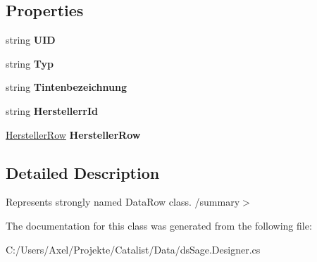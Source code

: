 \subsection*{Properties}
\begin{DoxyCompactItemize}
\item 
string {\bfseries U\+ID}\hypertarget{class_products_1_1_data_1_1ds_sage_1_1_tinte_row_a935601f7af8d05a25212af83d622baee}{}\label{class_products_1_1_data_1_1ds_sage_1_1_tinte_row_a935601f7af8d05a25212af83d622baee}

\item 
string {\bfseries Typ}\hypertarget{class_products_1_1_data_1_1ds_sage_1_1_tinte_row_a51e3b5c05f0c7ff0cdd9ec0b86e9361a}{}\label{class_products_1_1_data_1_1ds_sage_1_1_tinte_row_a51e3b5c05f0c7ff0cdd9ec0b86e9361a}

\item 
string {\bfseries Tintenbezeichnung}\hypertarget{class_products_1_1_data_1_1ds_sage_1_1_tinte_row_a2ae21f01d0214fb4448cc1bee9d4e1b0}{}\label{class_products_1_1_data_1_1ds_sage_1_1_tinte_row_a2ae21f01d0214fb4448cc1bee9d4e1b0}

\item 
string {\bfseries Herstellerr\+Id}\hypertarget{class_products_1_1_data_1_1ds_sage_1_1_tinte_row_a4be2c6c5ec3e9b046621e509246c02fe}{}\label{class_products_1_1_data_1_1ds_sage_1_1_tinte_row_a4be2c6c5ec3e9b046621e509246c02fe}

\item 
\hyperlink{class_products_1_1_data_1_1ds_sage_1_1_hersteller_row}{Hersteller\+Row} {\bfseries Hersteller\+Row}\hypertarget{class_products_1_1_data_1_1ds_sage_1_1_tinte_row_a661d303c483b4dfe5bd32b500e9b2f6b}{}\label{class_products_1_1_data_1_1ds_sage_1_1_tinte_row_a661d303c483b4dfe5bd32b500e9b2f6b}

\end{DoxyCompactItemize}


\subsection{Detailed Description}
Represents strongly named Data\+Row class. /summary$>$ 

The documentation for this class was generated from the following file\+:\begin{DoxyCompactItemize}
\item 
C\+:/\+Users/\+Axel/\+Projekte/\+Catalist/\+Data/ds\+Sage.\+Designer.\+cs\end{DoxyCompactItemize}
